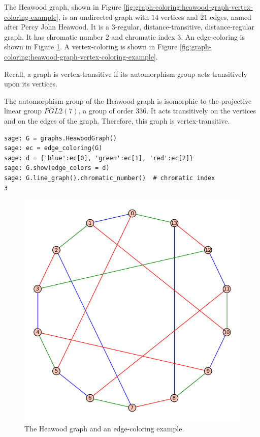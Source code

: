 \begin{example}
\label{example:graph-coloring:heawood-graph-example}
The Heawood graph, shown in Figure
\ref{fig:graph-coloring:heawood-graph-vertex-coloring-example},
is an undirected graph with $14$ vertices and $21$ edges, named after
Percy John Heawood.
It is a $3$-regular, distance-transitive, distance-regular graph.
It has chromatic number $2$ and chromatic index $3$.
An edge-coloring is shown in Figure
\ref{fig:graph-coloring:heawood-graph-edge-coloring-example}.
A vertex-coloring is shown in Figure
\ref{fig:graph-coloring:heawood-graph-vertex-coloring-example}.

Recall, a graph is vertex-transitive if its automorphism 
group acts transitively upon its vertices. 

The automorphism group of the Heawood graph is isomorphic to the
projective linear group $PGL2(7)$, a group of order $336$. It acts
transitively on the vertices and on the edges of the
graph. Therefore, this graph is vertex-transitive.

\begin{lstlisting}
sage: G = graphs.HeawoodGraph()
sage: ec = edge_coloring(G)
sage: d = {'blue':ec[0], 'green':ec[1], 'red':ec[2]}
sage: G.show(edge_colors = d)
sage: G.line_graph().chromatic_number()  # chromatic index
3
\end{lstlisting}


\begin{figure}[!htbp]
\centering
\includegraphics[scale=0.7]{image/graph-coloring/heawood-graph-edge-coloring-example}
\caption{The Heawood graph and an edge-coloring example.}
\label{fig:graph-coloring:heawood-graph-edge-coloring-example}
\end{figure}



\end{example}
